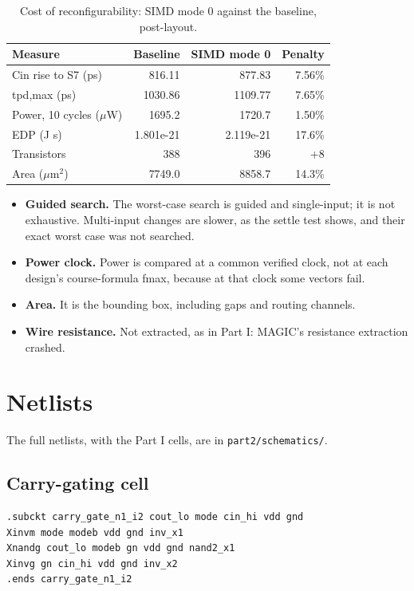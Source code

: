 \documentclass[11pt,a4paper]{article}
\begin{document}
\begin{table}[H]\centering\small
\caption{Cost of reconfigurability: SIMD mode 0 against the baseline, post-layout.}
\begin{tabular}{lrrr}
\toprule
\textbf{Measure} & \textbf{Baseline} & \textbf{SIMD mode 0} & \textbf{Penalty} \\
\midrule
Cin rise to S7 (ps) & 816.11 & 877.83 & 7.56\% \\
tpd,max (ps) & 1030.86 & 1109.77 & 7.65\% \\
Power, 10 cycles ($\mu$W) & 1695.2 & 1720.7 & 1.50\% \\
EDP (J s) & 1.801e-21 & 2.119e-21 & 17.6\% \\
Transistors & 388 & 396 & +8 \\
Area ($\mu$m$^2$) & 7749.0 & 8858.7 & 14.3\% \\
\bottomrule
\end{tabular}
\end{table}

\begin{itemize}
\item \textbf{Guided search.} The worst-case search is guided and single-input; it is not exhaustive. Multi-input changes are slower, as the settle test shows, and their exact worst case was not searched.
\item \textbf{Power clock.} Power is compared at a common verified clock, not at each design's course-formula fmax, because at that clock some vectors fail.
\item \textbf{Area.} It is the bounding box, including gaps and routing channels.
\item \textbf{Wire resistance.} Not extracted, as in Part I: MAGIC's resistance extraction crashed.
\end{itemize}

\appendix\section{Netlists}

The full netlists, with the Part I cells, are in \texttt{part2/schematics/}.

\subsection*{Carry-gating cell}\begin{small}\begin{verbatim}
.subckt carry_gate_n1_i2 cout_lo mode cin_hi vdd gnd
Xinvm mode modeb vdd gnd inv_x1
Xnandg cout_lo modeb gn vdd gnd nand2_x1
Xinvg gn cin_hi vdd gnd inv_x2
.ends carry_gate_n1_i2
\end{verbatim}\end{small}
\end{document}
